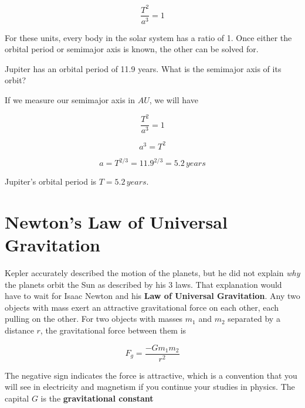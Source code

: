 \documentclass[12pt]{book}
\begin{document}
\begin{equation}
\frac{T^2}{a^3} = 1
\end{equation}

For these units, every body in the solar system has a ratio of 1. Once either the orbital period or semimajor axis is known, the other can be solved for.

\begin{exampleblock}

Jupiter has an orbital period of 11.9 years. What is the semimajor axis of its orbit?

\hspace{10pt}

If we measure our semimajor axis in $AU$, we will have

\begin{equation}
\frac{T^2}{a^3} = 1
\end{equation}

\begin{equation}
a^3 = T^2
\end{equation}

\begin{equation}
a = T^{2/3} = 11.9^{2/3} = 5.2 \, years
\end{equation}

Jupiter's orbital period is $T = 5.2 \, years$.

\end{exampleblock}

\section{Newton's Law of Universal Gravitation}

Kepler accurately described the motion of the planets, but he did not explain \textit{why} the planets orbit the Sun as described by his 3 laws. That explanation would have to wait for Isaac Newton and his \textbf{Law of Universal Gravitation}. Any two objects with mass exert an attractive gravitational force on each other, each pulling on the other. For two objects with masses $m_1$ and $m_2$ separated by a distance $r$, the gravitational force between them is

\begin{equation}
F_g = \frac{-G m_1 m_2}{r^2}
\end{equation}

The negative sign indicates the force is attractive, which is a convention that you will see in electricity and magnetism if you continue your studies in physics. The capital $G$ is the \textbf{gravitational constant}
\end{document}
